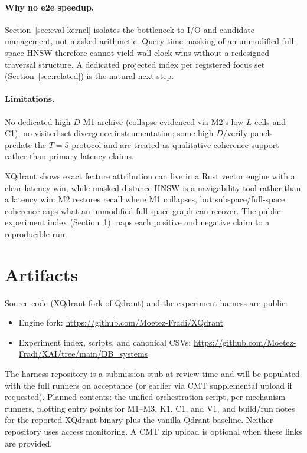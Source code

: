 \documentclass[sigconf,review,balance=false]{acmart}
\begin{document}
\paragraph{Why no e2e speedup.} Section~\ref{sec:eval-kernel} isolates the
bottleneck to I/O and candidate management, not masked arithmetic. Query-time
masking of an unmodified full-space HNSW therefore cannot yield wall-clock
wins without a redesigned traversal structure. A dedicated projected index
per registered focus set (Section~\ref{sec:related}) is the natural next step.

\paragraph{Limitations.} No dedicated high-$D$ M1 archive (collapse evidenced
via M2's low-$L$ cells and C1); no visited-set divergence instrumentation;
some high-$D$/verify panels predate the $T{=}5$ protocol and are treated as
qualitative coherence support rather than primary latency claims.

XQdrant shows exact feature attribution can live in a Rust vector engine with
a clear latency win, while masked-distance HNSW is a navigability tool rather
than a latency win: M2 restores recall where M1 collapses, but
subspace/full-space coherence caps what an unmodified full-space graph can
recover. The public experiment index (Section~\ref{sec:artifacts}) maps each
positive and negative claim to a reproducible run.

\section{Artifacts}
\label{sec:artifacts}

Source code (XQdrant fork of Qdrant) and the experiment harness are public:
\begin{itemize}
  \setlength{\itemsep}{0.15em}
  \setlength{\parsep}{0pt}
  \item Engine fork:
    \url{https://github.com/Moetez-Fradi/XQdrant}
  \item Experiment index, scripts, and canonical CSVs:
    \url{https://github.com/Moetez-Fradi/XAI/tree/main/DB_systems}
\end{itemize}
The harness repository is a submission stub at review time and will be
populated with the full runners on acceptance (or earlier via CMT
supplemental upload if requested). Planned contents: the unified
orchestration script, per-mechanism runners, plotting entry points for
M1--M3, K1, C1, and V1, and build/run notes for the reported XQdrant
binary plus the vanilla Qdrant baseline. Neither repository uses access
monitoring. A CMT zip upload is optional when these links are provided.



\end{document}
